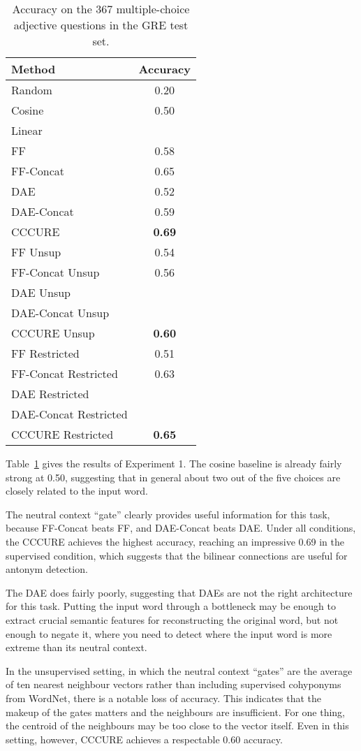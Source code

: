 \documentclass[11pt]{article}
\begin{document}
\begin{table}
\begin{tabular}{l|c}
\hline
\bf Method & \bf Accuracy \\
\hline
\hline
Random & 0.20 \\
Cosine & 0.50 \\
Linear & \\
\hline
FF & 0.58 \\
FF-Concat & 0.65 \\
DAE & 0.52 \\
DAE-Concat & 0.59 \\
CCCURE & \bf 0.69 \\
\hline
FF Unsup & 0.54 \\
FF-Concat Unsup & 0.56 \\
DAE Unsup & \\
DAE-Concat Unsup & \\
CCCURE Unsup & \bf 0.60 \\
\hline
FF Restricted & 0.51 \\
FF-Concat Restricted & 0.63 \\
DAE Restricted & \\
DAE-Concat Restricted & \\
CCCURE Restricted & \bf 0.65 \\
\end{tabular} 
\label{t:gre}
\caption{Accuracy on the 367 multiple-choice adjective questions in the GRE test set.}
\end{table}


Table~\ref{t:gre} gives the results of Experiment 1. The cosine baseline is already fairly strong at 0.50, suggesting that in general about two out of the five choices are closely related to the input word.

The neutral context ``gate'' clearly provides useful information for this task, because FF-Concat beats FF, and DAE-Concat beats DAE. Under all conditions, the CCCURE achieves the highest accuracy, reaching an impressive 0.69 in the supervised condition, which suggests that the bilinear connections are useful for antonym detection.

The DAE does fairly poorly, suggesting that DAEs are not the right architecture for this task. Putting the input word through a bottleneck may be enough to extract crucial semantic features for reconstructing the original word, but not enough to negate it, where you need to detect where the input word is more extreme than its neutral context.

In the unsupervised setting, in which the neutral context ``gates'' are the average of ten nearest neighbour vectors rather than including supervised cohyponyms from WordNet, there is a notable loss of accuracy. This indicates that the makeup of the gates matters and the neighbours are insufficient. For one thing, the centroid of the neighbours may be too close to the vector itself. Even in this setting, however, CCCURE achieves a respectable 0.60 accuracy.
\end{document}
